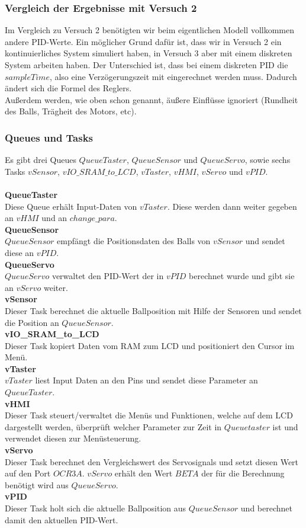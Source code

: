 \subsubsection{Vergleich der Ergebnisse mit Versuch 2}
Im Vergleich zu Versuch 2 benötigten wir beim eigentlichen Modell vollkommen andere PID-Werte. Ein möglicher Grund dafür ist, dass wir in Versuch 2 ein kontinuierliches System simuliert haben, in Versuch 3 aber mit einem diskreten System arbeiten haben. Der Unterschied ist, dass bei einem diskreten PID die $sampleTime$, also eine Verzögerungszeit mit eingerechnet werden muss. Dadurch ändert sich die Formel des Reglers.\\
Außerdem werden, wie oben schon genannt, äußere Einflüsse ignoriert (Rundheit des Balls, Trägheit des Motors, etc).

\subsubsection{Queues und Tasks}
Es gibt drei Queues $QueueTaster$, $QueueSensor$ und $QueueServo$, sowie sechs Tasks $vSensor$, $vIO\_SRAM\_to\_LCD$, $vTaster$, $vHMI$, $vServo$ und $vPID$.\\
\\
{\bfseries QueueTaster}\\
Diese Queue erhält Input-Daten von $vTaster$. Diese werden dann weiter gegeben an $vHMI$ und an $change\_para$.\\
{\bfseries QueueSensor} \\
$QueueSensor$ empfängt die Positionsdaten des Balls von $vSensor$ und sendet diese an $vPID$.\\
{\bfseries QueueServo} \\
$QueueServo$ verwaltet den PID-Wert der in $vPID$ berechnet wurde und gibt sie an $vServo$ weiter.\\
{\bfseries vSensor} \\
Dieser Task berechnet die aktuelle Ballposition mit Hilfe der Sensoren und sendet die Position an $QueueSensor$.\\
{\bfseries vIO\_SRAM\_to\_LCD} \\
Dieser Task kopiert Daten vom RAM zum LCD und positioniert den Cursor im Menü.\\
{\bfseries vTaster} \\
$vTaster$ liest Input Daten an den Pins und sendet diese Parameter an $QueueTaster$.\\
{\bfseries vHMI} \\
Dieser Task steuert/verwaltet die Menüs und Funktionen, welche auf dem LCD dargestellt werden, überprüft welcher Parameter zur Zeit in $Queuetaster$ ist und verwendet diesen zur Menüsteuerung.\\
{\bfseries vServo} \\
Dieser Task berechnet den Vergleichswert des Servosignals und setzt diesen Wert auf den Port $OCR3A$. $vServo$ erhält den Wert $BETA$ der für die Berechnung benötigt wird aus $QueueServo$.\\
{\bfseries vPID} \\
Dieser Task holt sich die aktuelle Ballposition aus $QueueSensor$ und berechnet damit den aktuellen PID-Wert.\\


